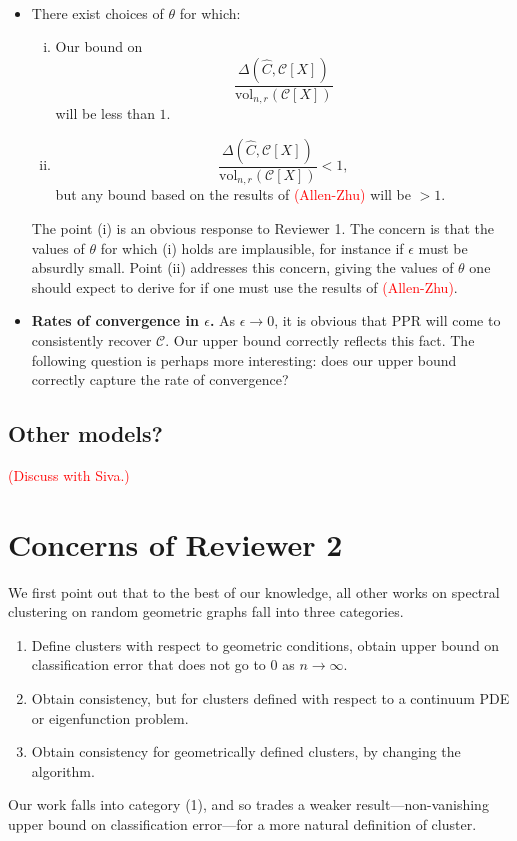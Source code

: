 \documentclass{article}
\newcommand{\vol}{\text{vol}}
\newcommand{\1}{\mathbf{1}}
\newcommand{\mc}[1]{\mathcal{#1}}
\newcommand{\wh}[1]{\widehat{#1}}
\theoremstyle{alden}
\theoremstyle{aldenthm}
\theoremstyle{definition}
\theoremstyle{remark}
\begin{document}
\paragraph{}

\begin{itemize}
	\item There exist choices of $\theta$ for which:
	\begin{enumerate}[(i)]
		\item  Our bound on 
		\begin{equation*}
		\frac{\Delta(\wh{C},\mc{C}[X])}{\vol_{n,r}(\mc{C}[X])}
		\end{equation*}
		will be less than $1$. 
		\item 
		\begin{equation*}
		\frac{\Delta(\wh{C},\mc{C}[X])}{\vol_{n,r}(\mc{C}[X])} < 1,
		\end{equation*}
		but any bound based on the results of \textcolor{red}{(Allen-Zhu)} will be $ > 1$.
	\end{enumerate}
	The point (i) is an obvious response to Reviewer 1. The concern is that the values of $\theta$ for which (i) holds are implausible, for instance if $\epsilon$ must be absurdly small. Point (ii) addresses this concern, giving the values of $\theta$ one should expect to derive for if one must use the results of \textcolor{red}{(Allen-Zhu)}. 
	\item \textbf{Rates of convergence in $\epsilon$.} As $\epsilon \to 0$, it is obvious that PPR will come to consistently recover $\mc{C}$. Our upper bound correctly reflects this fact. The following question is perhaps more interesting: does our upper bound correctly capture the rate of convergence?
\end{itemize}

\subsection{Other models?}

\textcolor{red}{(Discuss with Siva.)}


\section{Concerns of Reviewer 2}
We first point out that to the best of our knowledge, all other works on spectral clustering on random geometric graphs fall into three categories. 
\begin{enumerate}[(1)]
	\item Define clusters with respect to geometric conditions, obtain upper bound on classification error that does not go to $0$ as $n \to \infty$.
	\item Obtain consistency, but for clusters defined with respect to a continuum PDE or eigenfunction problem.
	\item Obtain consistency for geometrically defined clusters, by changing the algorithm.
\end{enumerate} 
Our work falls into category (1), and so trades a weaker result---non-vanishing upper bound on classification error---for a more natural definition of cluster. 
\end{document}
